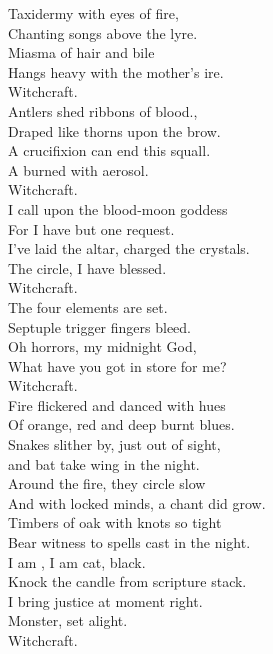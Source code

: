 Taxidermy with eyes of fire, \\
Chanting songs above the lyre. \\
Miasma of hair and bile \\
Hangs heavy with the mother's ire. \\
Witchcraft. \\

Antlers shed ribbons of blood., \\
Draped like thorns upon the brow. \\
A crucifixion can end this squall. \\
A  burned with aerosol. \\
Witchcraft. \\

I call upon the blood-moon goddess \\
For I have but one request. \\
I've laid the altar, charged the crystals. \\
The circle, I have blessed. \\
Witchcraft. \\

The four elements are set. \\
Septuple trigger fingers bleed. \\
Oh horrors, my midnight God, \\
What have you got in store for me? \\
Witchcraft. \\

Fire flickered and danced with hues \\
Of orange, red and deep burnt blues. \\
Snakes slither by, just out of sight, \\
 and bat take wing in the night. \\
Around the fire, they circle slow \\
And with locked minds, a chant did grow. \\
Timbers of oak with knots so tight \\
Bear witness to spells cast in the night. \\

I am , I am cat, black. \\
Knock the candle from scripture stack. \\
I bring justice at moment right. \\
 Monster, set alight. \\
Witchcraft. \\

